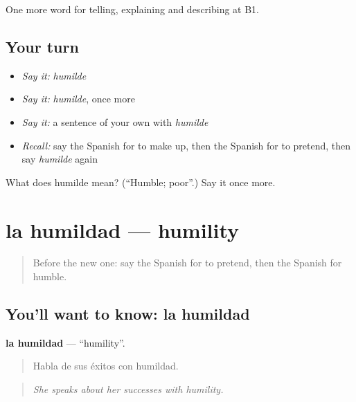 \begin{grammarlens}[title={What you've built}]
One more word for telling, explaining and describing at B1.
\end{grammarlens}

\subsection*{Your turn}
\begin{itemize}
\raggedright
  \item \emph{Say it:} \emph{humilde}
  \item \emph{Say it:} \emph{humilde}, once more
  \item \emph{Say it:} a sentence of your own with \emph{humilde}
  \item \emph{Recall:} say the Spanish for to make up, then the Spanish for to pretend, then say \emph{humilde} again
\end{itemize}

\begin{tcolorbox}[breakable,colback=teal!4,colframe=teal!35!black,title={Before you move on}]
What does humilde mean? (\textquotedblleft{}Humble; poor\textquotedblright{}.) Say it once more.
\end{tcolorbox}
\section[la humildad]{la humildad — humility}

\label{lesson:ES-C726-humildad}



\begin{quote}
Before the new one: say the Spanish for to pretend, then the Spanish for humble.
\end{quote}

\subsection*{You'll want to know: la humildad}
\textbf{la humildad} — \textquotedblleft{}humility\textquotedblright{}.

\begin{quote}
Habla de sus éxitos con humildad.
\end{quote}

\begin{quote}
\emph{She speaks about her successes with humility.}
\end{quote}

